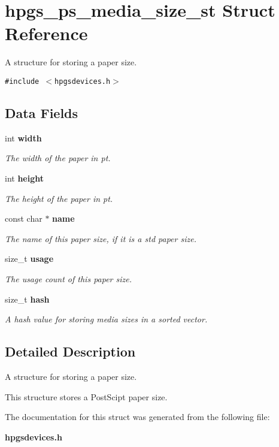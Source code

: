 \section{hpgs\_\-ps\_\-media\_\-size\_\-st Struct Reference}
\label{structhpgs__ps__media__size__st}
A structure for storing a paper size.  


{\tt \#include $<$hpgsdevices.h$>$}

\subsection*{Data Fields}
\begin{CompactItemize}
\item 
int {\bf width}\label{structhpgs__ps__media__size__st_ca91814a4af3989fb51c2e58c51e523a}

\begin{CompactList}\small\item\em The width of the paper in pt. \item\end{CompactList}\item 
int {\bf height}\label{structhpgs__ps__media__size__st_106d89beb31eb46aa807ef2c3302bc95}

\begin{CompactList}\small\item\em The height of the paper in pt. \item\end{CompactList}\item 
const char $\ast$ {\bf name}\label{structhpgs__ps__media__size__st_3384834f44a02e470913195e64e93d5a}

\begin{CompactList}\small\item\em The name of this paper size, if it is a std paper size. \item\end{CompactList}\item 
size\_\-t {\bf usage}\label{structhpgs__ps__media__size__st_cea1bedaf8494023dc288edd3e7f5fbf}

\begin{CompactList}\small\item\em The usage count of this paper size. \item\end{CompactList}\item 
size\_\-t {\bf hash}\label{structhpgs__ps__media__size__st_5b695a806ae47a840a649170860754b6}

\begin{CompactList}\small\item\em A hash value for storing media sizes in a sorted vector. \item\end{CompactList}\end{CompactItemize}


\subsection{Detailed Description}
A structure for storing a paper size. 

This structure stores a PostScipt paper size. 

The documentation for this struct was generated from the following file:\begin{CompactItemize}
\item 
{\bf hpgsdevices.h}\end{CompactItemize}
